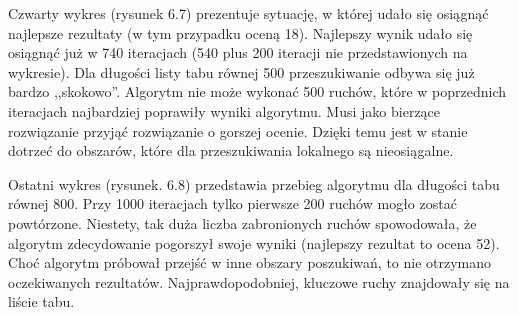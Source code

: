 Czwarty wykres (rysunek 6.7) prezentuje sytuację, w której udało się osiągnąć najlepsze rezultaty (w tym przypadku oceną 18). Najlepszy wynik udało się osiągnąć już w 740 iteracjach (540 plus 200 iteracji nie przedstawionych na wykresie). Dla długości listy tabu równej 500 przeszukiwanie odbywa się już bardzo ,,skokowo''. Algorytm nie może wykonać 500 ruchów, które w poprzednich iteracjach najbardziej poprawiły wyniki algorytmu. Musi jako bierzące rozwiązanie przyjąć rozwiązanie o gorszej ocenie. Dzięki temu jest w stanie dotrzeć do obszarów, które dla przeszukiwania lokalnego są nieosiągalne.

Ostatni wykres (rysunek. 6.8) przedstawia przebieg algorytmu dla długości tabu równej 800. Przy 1000 iteracjach tylko pierwsze 200 ruchów mogło zostać powtórzone. Niestety, tak duża liczba zabronionych ruchów spowodowała, że algorytm zdecydowanie pogorszył swoje wyniki (najlepszy rezultat to ocena 52). Choć algorytm próbował przejść w inne obszary poszukiwań, to nie otrzymano oczekiwanych rezultatów. Najprawdopodobniej, kluczowe ruchy znajdowały się na liście tabu.